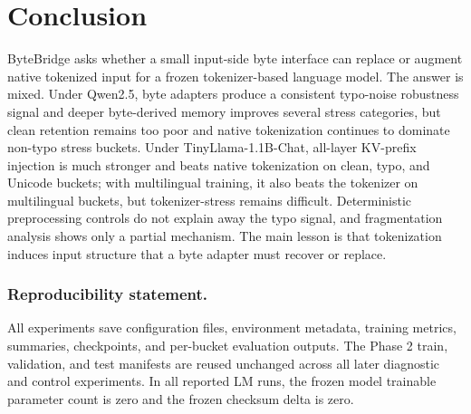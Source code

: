 \documentclass[runningheads]{llncs}
\newcommand{\bb}{ByteBridge}
\newcommand{\tinyllama}{TinyLlama-1.1B-Chat}
\begin{document}
\section{Conclusion}

\bb{} asks whether a small input-side byte interface can replace or augment native tokenized input for a frozen tokenizer-based language model. The answer is mixed. Under Qwen2.5, byte adapters produce a consistent typo-noise robustness signal and deeper byte-derived memory improves several stress categories, but clean retention remains too poor and native tokenization continues to dominate non-typo stress buckets. Under \tinyllama{}, all-layer KV-prefix injection is much stronger and beats native tokenization on clean, typo, and Unicode buckets; with multilingual training, it also beats the tokenizer on multilingual buckets, but tokenizer-stress remains difficult. Deterministic preprocessing controls do not explain away the typo signal, and fragmentation analysis shows only a partial mechanism. The main lesson is that tokenization induces input structure that a byte adapter must recover or replace.

\subsubsection*{Reproducibility statement.}
All experiments save configuration files, environment metadata, training metrics, summaries, checkpoints, and per-bucket evaluation outputs. The Phase 2 train, validation, and test manifests are reused unchanged across all later diagnostic and control experiments. In all reported LM runs, the frozen model trainable parameter count is zero and the frozen checksum delta is zero.



\end{document}

